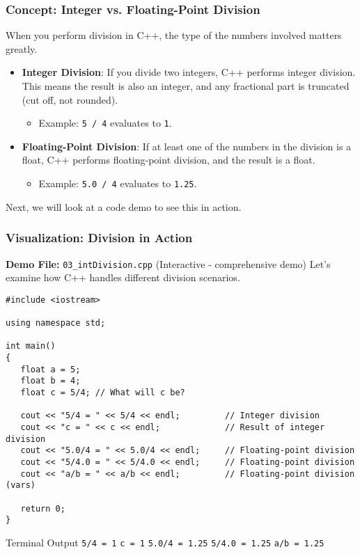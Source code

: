 \documentclass{beamer}
\begin{document}
\begin{frame}
\frametitle{Concept: Integer vs. Floating-Point Division}
When you perform division in C++, the type of the numbers involved matters greatly.
\begin{itemize}
    \item \textbf{Integer Division}: If you divide two integers, C++ performs integer division. This means the result is also an integer, and any fractional part is \alert{truncated} (cut off, not rounded).
    \begin{itemize}
        \item Example: \texttt{5 / 4} evaluates to \texttt{1}.
    \end{itemize}
    \pause
    \item \textbf{Floating-Point Division}: If at least one of the numbers in the division is a float, C++ performs floating-point division, and the result is a float.
    \begin{itemize}
        \item Example: \texttt{5.0 / 4} evaluates to \texttt{1.25}.
    \end{itemize}
\end{itemize}
\vspace{1em}
Next, we will look at a code demo to see this in action.
\end{frame}

\begin{frame}[fragile]
\frametitle{Visualization: Division in Action}
\textbf{Demo File:} \texttt{03\_intDivision.cpp} (Interactive - comprehensive demo)
\newline
\vspace{1em}
Let's examine how C++ handles different division scenarios.

\begin{verbatim}
#include <iostream>

using namespace std;

int main()
{
   float a = 5;
   float b = 4;
   float c = 5/4; // What will c be?

   cout << "5/4 = " << 5/4 << endl;         // Integer division
   cout << "c = " << c << endl;             // Result of integer division
   cout << "5.0/4 = " << 5.0/4 << endl;     // Floating-point division
   cout << "5/4.0 = " << 5/4.0 << endl;     // Floating-point division
   cout << "a/b = " << a/b << endl;         // Floating-point division (vars)

   return 0;
}
\end{verbatim}
\pause
\begin{block}{Terminal Output}
\texttt{5/4 = 1} \newline
\texttt{c = 1} \newline
\texttt{5.0/4 = 1.25} \newline
\texttt{5/4.0 = 1.25} \newline
\texttt{a/b = 1.25}
\end{block}
\end{frame}
\end{document}
